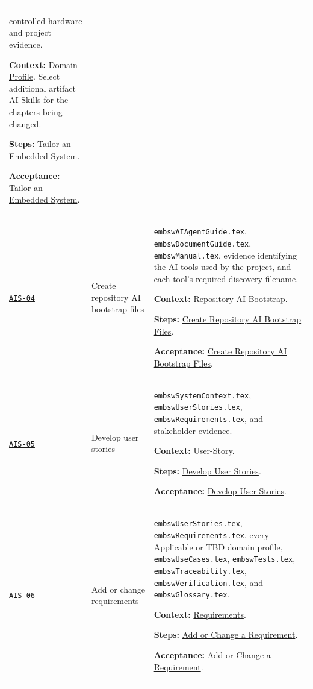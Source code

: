 \begin{tabularx}{\linewidth}{L{1.6cm}L{3.1cm}Y}
controlled hardware and project evidence.\par\textbf{Context:} \hyperref[Section:AIDomainContext]{Domain-Profile}. Select additional artifact AI Skills for the chapters being changed.\par\textbf{Steps:} \hyperref[Section:AIEmbeddedTaskSteps]{Tailor an Embedded System}.\par\textbf{Acceptance:} \hyperref[Section:AIEmbeddedAcceptance]{Tailor an Embedded System}.\\
\label{Skill:AIS-04}\hyperref[Section:AIBootstrapSteps]{\texttt{AIS-04}} & Create repository AI bootstrap files & \texttt{embswAIAgentGuide.tex},
\texttt{embswDocumentGuide.tex}, \texttt{embswManual.tex}, evidence identifying the
AI tools used by the project, and each tool's required discovery filename.\par\textbf{Context:} \hyperref[Section:AIRepositoryBootstrap]{Repository AI Bootstrap}.\par\textbf{Steps:} \hyperref[Section:AIBootstrapTaskSteps]{Create Repository AI Bootstrap Files}.\par\textbf{Acceptance:} \hyperref[Section:AIBootstrapAcceptance]{Create Repository AI Bootstrap Files}.\\
\label{Skill:AIS-05}\hyperref[Section:AIStorySteps]{\texttt{AIS-05}} & Develop user stories & \texttt{embswSystemContext.tex}, \texttt{embswUserStories.tex}, \texttt{embswRequirements.tex}, and stakeholder evidence.\par\textbf{Context:} \hyperref[Section:AIUserStoryContext]{User-Story}.\par\textbf{Steps:} \hyperref[Section:AIStoryTaskSteps]{Develop User Stories}.\par\textbf{Acceptance:} \hyperref[Section:AIStoryAcceptance]{Develop User Stories}.\\
\label{Skill:AIS-06}\hyperref[Section:AIRequirementSteps]{\texttt{AIS-06}} & Add or change requirements & \texttt{embswUserStories.tex}, \texttt{embswRequirements.tex}, every Applicable or TBD domain profile, \texttt{embswUseCases.tex}, \texttt{embswTests.tex}, \texttt{embswTraceability.tex}, \texttt{embswVerification.tex}, and \texttt{embswGlossary.tex}.\par\textbf{Context:} \hyperref[Section:AIRequirementsContext]{Requirements}.\par\textbf{Steps:} \hyperref[Section:AIRequirementTaskSteps]{Add or Change a Requirement}.\par\textbf{Acceptance:} \hyperref[Section:AIRequirementAcceptance]{Add or Change a Requirement}.\\

\end{tabularx}

